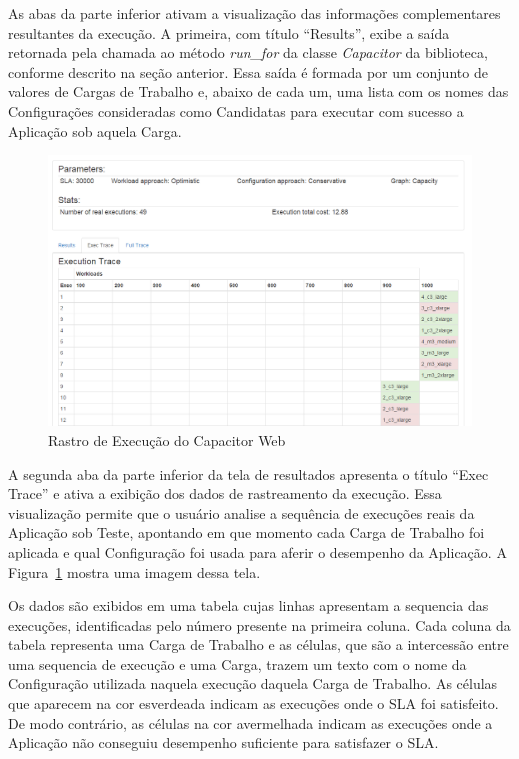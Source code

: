 As abas da parte inferior ativam a visualização das informações complementares 
resultantes da execução. A primeira, com título ``Results'', exibe a saída 
retornada pela chamada ao método \emph{run\_for} da classe \emph{Capacitor} da 
biblioteca, conforme descrito na seção anterior. Essa saída é formada por um 
conjunto de valores de Cargas de Trabalho e, abaixo de cada um, uma lista com os 
nomes das Configurações consideradas como Candidatas para executar com sucesso a 
Aplicação sob aquela Carga.  

\begin{figure}[htb]
  \begin{center}
    \includegraphics[scale=0.45]{img/CapacitorWeb_ExecutionTrace}
  \end{center}
  \caption{\label{fig:capacitor_web_trace}Rastro de Execução do Capacitor Web}
\end{figure}

A segunda aba da parte inferior da tela de resultados apresenta o título 
``Exec Trace'' e ativa a exibição dos dados de rastreamento da execução. Essa
visualização permite que o usuário analise a sequência de execuções reais da 
Aplicação sob Teste, apontando em que momento cada Carga de Trabalho foi aplicada
e qual Configuração foi usada para aferir o desempenho da Aplicação. A 
Figura~\ref{fig:capacitor_web_trace} mostra uma imagem dessa tela.

Os dados são exibidos em uma tabela cujas linhas apresentam a sequencia das 
execuções, identificadas pelo número presente na primeira coluna. Cada coluna da
tabela representa uma Carga de Trabalho e as células, que são a intercessão entre
uma sequencia de execução e uma Carga, trazem um texto com o nome da Configuração 
utilizada naquela execução daquela Carga de Trabalho. As células que aparecem na 
cor esverdeada indicam as execuções onde o SLA foi satisfeito. De modo contrário, 
as células na cor avermelhada indicam as execuções onde a Aplicação não conseguiu 
desempenho suficiente para satisfazer o SLA.
 
